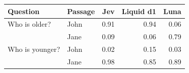 \begin{tabular}{llrrr}
\toprule
Question & Passage & Jev & Liquid d1 & Luna \\
\midrule
Who is older?   & John & 0.91 & 0.94 & 0.06 \\
                & Jane & 0.09 & 0.06 & 0.79 \\
Who is younger? & John & 0.02 & 0.15 & 0.03 \\
                & Jane & 0.98 & 0.85 & 0.89 \\
\bottomrule
\end{tabular}%
